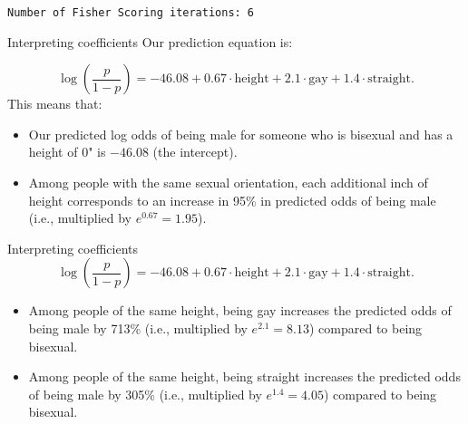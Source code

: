 \documentclass{beamer}\usepackage[]{graphicx}\usepackage[]{color}
\makeatletter
\newcommand{\hlopt}[1]{\textcolor[rgb]{1,0.894,0.769}{#1}}%
\newcommand{\hlstd}[1]{\textcolor[rgb]{1,0.894,0.769}{#1}}%
\newcommand{\hlkwb}[1]{\textcolor[rgb]{0.804,0.776,0.451}{#1}}%
\newcommand{\hlkwd}[1]{\textcolor[rgb]{1,0.78,0.769}{#1}}%
\newenvironment{kframe}{%
 \def\at@end@of@kframe{}%
 \ifinner\ifhmode%
  \def\at@end@of@kframe{\end{minipage}}%
  \begin{minipage}{\columnwidth}%
 \fi\fi%
 \def\FrameCommand##1{\hskip\@totalleftmargin \hskip-\fboxsep
 \colorbox{shadecolor}{##1}\hskip-\fboxsep
     \hskip-\linewidth \hskip-\@totalleftmargin \hskip\columnwidth}%
 \MakeFramed {\advance\hsize-\width
   \@totalleftmargin\z@ \linewidth\hsize
   \@setminipage}}%
 {\par\unskip\endMakeFramed%
 \at@end@of@kframe}
\newenvironment{knitrout}{}{} %
\makeatother
\begin{document}
\begin{darkframes}
\begin{frame}[fragile]
\begin{knitrout}
\begin{kframe}
\begin{verbatim}
Number of Fisher Scoring iterations: 6
\end{verbatim}
\end{kframe}
\end{knitrout}
    \end{frame}

    \begin{frame}{Interpreting coefficients}
      Our prediction equation is:
      
      \[
        \log\left(\frac{p}{1-p}\right) =
          -46.08 +
          0.67\cdot\text{height} +
          2.1\cdot\text{gay} +
          1.4\cdot\text{straight}.
      \]
      This means that:
      \begin{itemize}[<+->]
        \item Our predicted log odds of being male for someone who is bisexual and has a height of 0" is $-46.08$ (the intercept).
        \item Among people with the same sexual orientation, each additional inch of height corresponds to an increase in 95\% in predicted odds of being male (i.e., multiplied by $e^{0.67} = 1.95$).
      \end{itemize}
    \end{frame}

    \begin{frame}{Interpreting coefficients}
      \[
        \log\left(\frac{p}{1-p}\right) =
          -46.08 +
          0.67\cdot\text{height} +
          2.1\cdot\text{gay} +
          1.4\cdot\text{straight}.
      \]
      \begin{itemize}[<+->]
        \item Among people of the same height, being gay increases the predicted odds of being male by 713\% (i.e., multiplied by $e^{2.1} = 8.13$) compared to being bisexual.
        \item Among people of the same height, being straight increases the predicted odds of being male by 305\% (i.e., multiplied by $e^{1.4} = 4.05$) compared to being bisexual.
      \end{itemize}
    \end{frame}

\end{darkframes}
\end{document}
